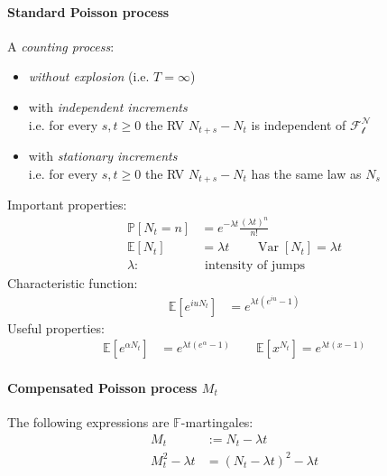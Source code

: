 \documentclass[a4paper,landscape,8pt,fleqn]{scrartcl}
\DeclareMathOperator{\Var}{Var}				%
\begin{document}
\begin{multicols*}{4}
\paragraph{Standard Poisson process}
A \textit{counting process}:
\begin{itemize}
\item \textit{without explosion} (i.e. $T = \infty$)
\item with \textit{independent increments} \\
i.e. for every $s,t \geq 0$ the RV $N_{t+s} - N_t$ is independent of $\mathcal{F_t^N}$
\item with \textit{stationary increments} \\
i.e. for every $s,t \geq 0$ the RV $N_{t+s} - N_t$ has the same law as $N_s$
\end{itemize}
Important properties:
\begin{align*}
\mathbb{P}[N_t = n] &= e^{-\lambda t} \frac{(\lambda t)^n}{n!} \\
\mathbb{E}[N_t] &= \lambda t \qquad \Var[N_t] = \lambda t \\
\lambda: &\text{ intensity of jumps}
\end{align*}
Characteristic function:
\begin{align*}
\mathbb{E}\left[ e^{i u N_t} \right] &= e^{\lambda t (e^{i u} - 1)}
\end{align*}
Useful properties:
\begin{align*}
\mathbb{E}\left[ e^{\alpha N_t} \right] &= e^{\lambda t (e^\alpha - 1)} \qquad \mathbb{E}\left[ x^{N_t} \right] = e^{\lambda t (x-1)}
\end{align*}

\paragraph{Compensated Poisson process $M_t$}
The following expressions are $\mathbb{F}$-martingales:
\begin{align*}
M_t &:= N_t - \lambda t \\
M_t^2 - \lambda t &= (N_t - \lambda t)^2 - \lambda t
\end{align*}


\end{multicols*}
\end{document}
